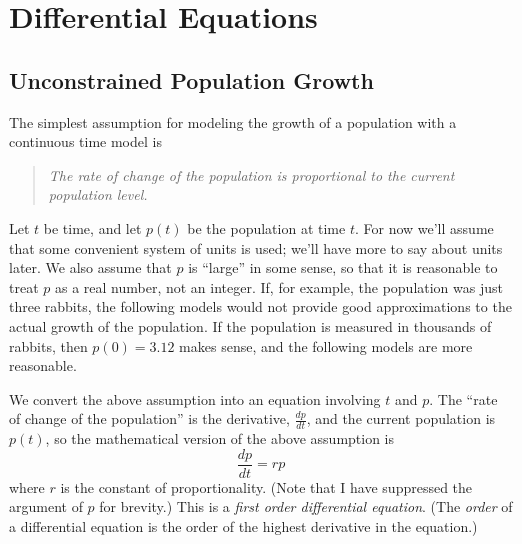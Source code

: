 
\chapter{Differential Equations}



\section{Unconstrained Population Growth}
\label{sec:UnconstrPopGrowth}
% 
% 
The simplest assumption for modeling the growth of a population
with a continuous time model is
\begin{quote}
\emph{The rate of change of the population is proportional to the current population level.}
\end{quote} 
Let $t$ be time, and let $p(t)$ be the population at time $t$.
For now we'll assume that some convenient system of units is used;
we'll have more to say about units later.
We also assume that $p$ is ``large'' in some sense, so that it is reasonable
to treat $p$ as a real number, not an integer.
If, for example, the population was just three rabbits, the following
models would not provide good
approximations to the actual growth of the population.
If the population is measured in thousands of rabbits,
then $p(0)=3.12$ makes sense,
and the following models are more reasonable.

We convert the above assumption into an equation involving $t$
and $p$.
The ``rate of change of the population'' is the derivative, $\frac{dp}{dt}$, and the
current population is $p(t)$, so the mathematical version of the above
assumption is
\begin{equation}
  \frac{dp}{dt} = rp
\label{eqn:growth}
\end{equation}
where $r$ is the constant of proportionality.
(Note that I have suppressed the argument of $p$ for brevity.)
This is a \emph{first order differential equation}.
(The \emph{order} of a differential equation is the order of the
highest derivative in the equation.)

